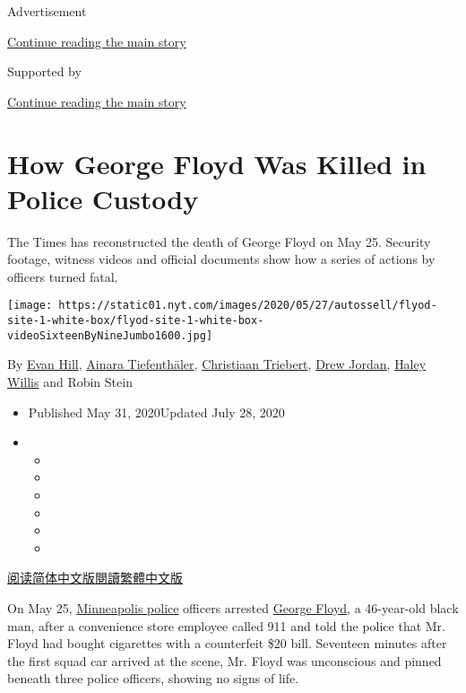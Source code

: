 Advertisement

\protect\hyperlink{after-top}{Continue reading the main story}

Supported by

\protect\hyperlink{after-sponsor}{Continue reading the main story}

\hypertarget{how-george-floyd-was-killed-in-police-custody}{%
\section{How George Floyd Was Killed in Police
Custody}\label{how-george-floyd-was-killed-in-police-custody}}

The Times has reconstructed the death of George Floyd on May 25.
Security footage, witness videos and official documents show how a
series of actions by officers turned fatal.

\texttt{[image: https://static01.nyt.com/images/2020/05/27/autossell/flyod-site-1-white-box/flyod-site-1-white-box-videoSixteenByNineJumbo1600.jpg]}

By \href{https://www.nytimes.com/by/evan-hill}{Evan Hill},
\href{https://www.nytimes.com/by/ainara-tiefenthaler}{Ainara
Tiefenthäler},
\href{http://nytimes.com/by/christiaan-triebert}{Christiaan Triebert},
\href{https://www.nytimes.com/by/drew-jordan}{Drew Jordan},
\href{https://www.nytimes.com/by/haley-willis}{Haley Willis} and Robin
Stein

\begin{itemize}
\item
  Published May 31, 2020Updated July 28, 2020
\item
  \begin{itemize}
  \item
  \item
  \item
  \item
  \item
  \item
  \end{itemize}
\end{itemize}

\href{https://cn.nytimes.com/usa/20200602/george-floyd-investigation/}{阅读简体中文版}\href{https://cn.nytimes.com/usa/20200602/george-floyd-investigation/zh-hant}{閱讀繁體中文版}

On May 25,
\href{https://www.nytimes.com/2020/07/28/us/umbrella-man-identified-minneapolis.html}{Minneapolis
police} officers arrested
\href{https://www.nytimes.com/2020/07/28/us/umbrella-man-identified-minneapolis.html}{George
Floyd}, a 46-year-old black man, after a convenience store employee
called 911 and told the police that Mr. Floyd had bought cigarettes with
a counterfeit \$20 bill. Seventeen minutes after the first squad car
arrived at the scene, Mr. Floyd was unconscious and pinned beneath three
police officers, showing no signs of life.

